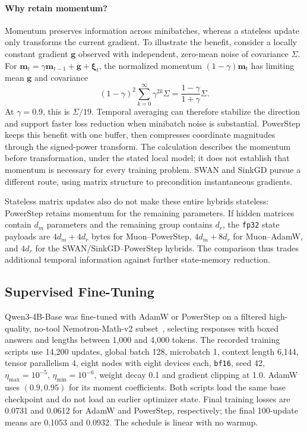 \documentclass{article}
\begin{document}
\paragraph{Why retain momentum?}
Momentum preserves information across minibatches, whereas a stateless update only transforms the current gradient. To illustrate the benefit, consider a locally constant gradient $\mathbf{g}$ observed with independent, zero-mean noise of covariance $\Sigma$. For $\mathbf{m}_t=\gamma\mathbf{m}_{t-1}+\mathbf{g}+\boldsymbol{\xi}_t$, the normalized momentum $(1-\gamma)\mathbf{m}_t$ has limiting mean $\mathbf{g}$ and covariance
\[
(1-\gamma)^2\sum_{k=0}^{\infty}\gamma^{2k}\Sigma
=\frac{1-\gamma}{1+\gamma}\Sigma.
\]
At $\gamma=0.9$, this is $\Sigma/19$. Temporal averaging can therefore stabilize the direction and support faster loss reduction when minibatch noise is substantial. PowerStep keeps this benefit with one buffer, then compresses coordinate magnitudes through the signed-power transform. The calculation describes the momentum before transformation, under the stated local model; it does not establish that momentum is necessary for every training problem. SWAN and SinkGD pursue a different route, using matrix structure to precondition instantaneous gradients.

Stateless matrix updates also do not make these entire hybrids stateless: PowerStep retains momentum for the remaining parameters. If hidden matrices contain $d_m$ parameters and the remaining group contains $d_r$, the \texttt{fp32} state payloads are $4d_m+4d_r$ bytes for Muon--PowerStep, $4d_m+8d_r$ for Muon--AdamW, and $4d_r$ for the SWAN/SinkGD--PowerStep hybrids. The comparison thus trades additional temporal information against further state-memory reduction.

\subsection{Supervised Fine-Tuning}\label{sec:sft}
Qwen3-4B-Base was fine-tuned with AdamW or PowerStep on a filtered high-quality, no-tool Nemotron-Math-v2 subset~\citep{nvidia2026nemotronmath}, selecting responses with boxed answers and lengths between 1,000 and 4,000 tokens. The recorded training scripts use 14,200 updates, global batch 128, microbatch 1, context length 6,144, tensor parallelism 4, eight nodes with eight devices each, \texttt{bf16}, seed 42, $\eta_{\max}=10^{-5}$, $\eta_{\min}=10^{-6}$, weight decay 0.1 and gradient clipping at 1.0. AdamW uses $(0.9,0.95)$ for its moment coefficients. Both scripts load the same base checkpoint and do not load an earlier optimizer state. Final training losses are 0.0731 and 0.0612 for AdamW and PowerStep, respectively; the final 100-update means are 0.1053 and 0.0932. The schedule is linear with no warmup.
\end{document}
